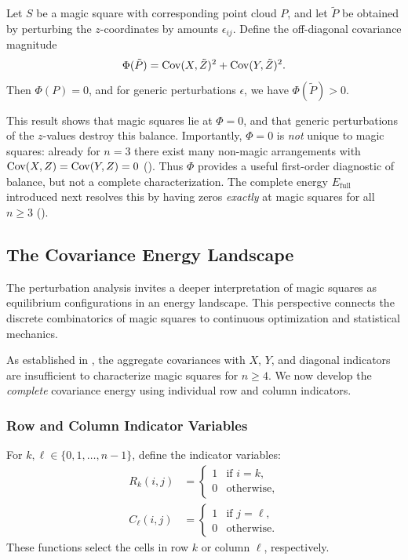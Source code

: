 \begin{proposition}
\label{prop:local_opt}
Let $S$ be a magic square with corresponding point cloud $P$, 
and let $\tilde{P}$ be obtained by perturbing the $z$-coordinates by amounts $\epsilon_{ij}$.
Define the off-diagonal covariance magnitude
\[
\Phi(\tilde{P}) = \mathrm{Cov}(X, \tilde{Z})^2 + \mathrm{Cov}(Y, \tilde{Z})^2.
\]
Then $\Phi(P) = 0$, and for generic perturbations $\epsilon$, we have $\Phi(\tilde{P}) > 0$.
\end{proposition}

This result shows that magic squares lie at $\Phi=0$, and that generic perturbations of the $z$-values destroy this balance.
Importantly, $\Phi=0$ is \emph{not} unique to magic squares: already for $n=3$ there exist many non-magic arrangements with
$\mathrm{Cov}(X,Z)=\mathrm{Cov}(Y,Z)=0$ ().
Thus $\Phi$ provides a useful first-order diagnostic of balance, but not a complete characterization.
The complete energy $E_{\mathrm{full}}$ introduced next resolves this by having zeros \emph{exactly} at magic squares for all $n\ge 3$
().

\subsection{The Covariance Energy Landscape}
\label{sec:energy_landscape}

The perturbation analysis invites a deeper interpretation of magic squares 
as equilibrium configurations in an energy landscape.
This perspective connects the discrete combinatorics of magic squares 
to continuous optimization and statistical mechanics.

As established in , the aggregate covariances with $X$, $Y$, and diagonal indicators
are insufficient to characterize magic squares for $n \geq 4$.
We now develop the \emph{complete} covariance energy using individual row and column indicators.

\subsubsection{Row and Column Indicator Variables}

\begin{definition}
For $k, \ell \in \{0, 1, \ldots, n-1\}$, define the indicator variables:
\begin{align}
R_k(i,j) &= \begin{cases} 1 & \text{if } i = k, \\ 0 & \text{otherwise}, \end{cases} \\
C_\ell(i,j) &= \begin{cases} 1 & \text{if } j = \ell, \\ 0 & \text{otherwise}. \end{cases}
\end{align}
These functions select the cells in row $k$ or column $\ell$, respectively.
\end{definition}

